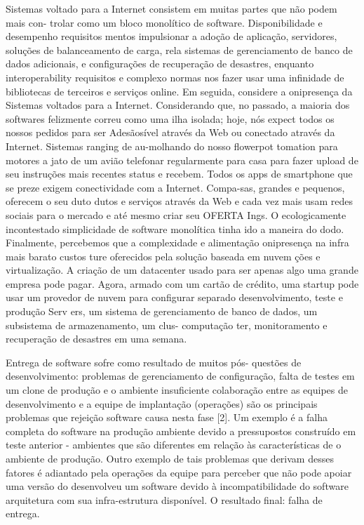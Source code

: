 Sistemas voltado para a Internet consistem em muitas partes que não podem mais con-
trolar como um bloco monolítico de software. Disponibilidade e desempenho requisitos
mentos impulsionar a adoção de aplicação, servidores, soluções de balanceamento de
 carga, rela sistemas de gerenciamento de banco de dados adicionais, e configurações de
recuperação de desastres, enquanto interoperability requisitos e complexo normas
nos fazer usar uma infinidade de bibliotecas de terceiros e serviços online. Em
seguida, considere a onipresença da Sistemas voltados para a Internet. Considerando
que, no passado, a maioria dos softwares felizmente correu como uma ilha isolada;
hoje, nós expect todos os nossos pedidos para ser Adesãosível através da Web ou
conectado através da Internet. Sistemas ranging de au-molhando do nosso flowerpot
tomation para motores a jato de um avião telefonar regularmente para casa para
fazer upload de seu instruções mais recentes status e recebem. Todos os apps de
smartphone que se preze exigem conectividade com a Internet. Compa-sas, grandes e
pequenos, oferecem o seu duto dutos e serviços através da Web e cada vez mais usam
redes sociais para o mercado e até mesmo criar seu OFERTA Ings. O ecologicamente
 incontestado simplicidade de software monolítica tinha ido a maneira do dodo. Finalmente, percebemos que a complexidade e
alimentação onipresença na infra mais barato custos ture oferecidos pela solução
baseada em nuvem ções e virtualização. A criação de um datacenter usado para ser apenas algo
uma grande empresa pode pagar. Agora, armado com um cartão de crédito, uma startup pode
usar um provedor de nuvem para configurar separado desenvolvimento, teste e produção Serv
ers, um sistema de gerenciamento de banco de dados, um subsistema de armazenamento, um clus- computação
ter, monitoramento e recuperação de desastres em uma semana. \cite{6265084}


Entrega de software sofre como resultado de muitos pós-
questões de desenvolvimento: problemas de gerenciamento de configuração,
falta de testes em um clone de produção e o ambiente
insuficiente colaboração entre as equipes de desenvolvimento e
a equipe de implantação (operações) são os principais problemas que
rejeição software causa nesta fase [2]. Um exemplo é a
falha completa do software na produção
ambiente devido a pressupostos construído em teste anterior
- ambientes que são diferentes em relação às características de
o ambiente de produção. Outro exemplo de tais
problemas que derivam desses fatores é adiantado pela
operações da equipe para perceber que não pode apoiar uma versão do
desenvolveu um software devido à incompatibilidade do software
arquitetura com sua infra-estrutura disponível. O resultado final:
falha de entrega.\cite{akerele2013system}



